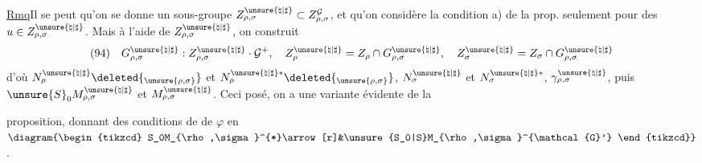 \uline{Rmq}\quad Il se peut qu'on se donne un sous-groupe
\(Z_{\rho,\sigma}^{\unsure{\natural|\sharp}}\subset Z_{\rho,\sigma}^{\mathcal{G}}\),
et qu'on considère  la condition a) de la prop.
seulement pour des \(u\in Z_{\rho,\sigma}^{\unsure{\natural|\sharp}}\).
Mais à l'aide de \(Z_{\rho,\sigma}^{\unsure{\natural|\sharp}}\), on construit
\[
(94)\quad
G_{\rho,\sigma}^{\unsure{\natural|\sharp}}:
Z_{\rho,\sigma}^{\unsure{\natural|\sharp}}\cdot\mathcal{G}^+,
\quad Z_\rho^{\unsure{\natural|\sharp}}=Z_\rho\cap G_{\rho,\sigma}^{\unsure{\natural|\sharp}},
\quad Z_\sigma^{\unsure{\natural|\sharp}}=Z_\sigma\cap G_{\rho,\sigma}^{\unsure{\natural|\sharp}}
\]
d'où \(N_\rho^{\unsure{\natural|\sharp}}\deleted{_{\unsure{\rho,\sigma}}}\)
et \(N_\rho^{\unsure{\natural|\sharp}*}\deleted{_{\unsure{\rho,\sigma}}}\),
\(N_\sigma^{\unsure{\natural|\sharp}}\) et
\(N_\sigma^{\unsure{\natural|\sharp}*}\),
\(\gamma_{\rho,\sigma}^{\unsure{\natural|\sharp}}\), puis
\(\unsure{S}_0M_{\rho,\sigma}^{\unsure{\natural|\sharp}}\) et
\(M_{\rho,\sigma}^{\unsure{\natural|\sharp}}\).
Ceci posé, on a une variante évidente de la


proposition, donnant des conditions de  de \(\varphi\) en
\(\diagram{\begin{tikzcd}
S_0M_{\rho,\sigma}^{*}\arrow[r]&\unsure{S_0|S}M_{\rho,\sigma}^{\mathcal{G}'}
\end{tikzcd}}\).


